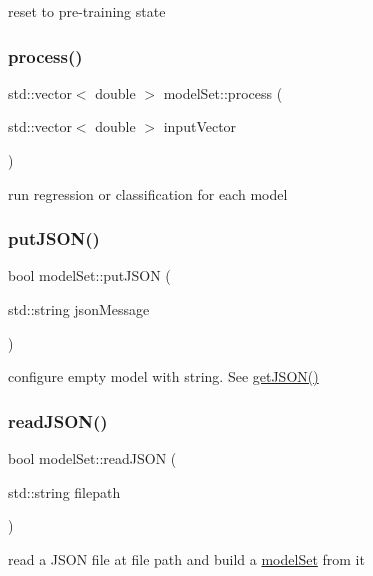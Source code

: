 reset to pre-\/training state \mbox{\label{classmodel_set_a232b11aa2987dd7db56c0f55edf868ea}} 
\subsubsection{\texorpdfstring{process()}{process()}}
{\footnotesize\ttfamily std\+::vector$<$ double $>$ model\+Set\+::process (\begin{DoxyParamCaption}\item[{std\+::vector$<$ double $>$}]{input\+Vector }\end{DoxyParamCaption})}

run regression or classification for each model \mbox{\label{classmodel_set_a09b07168fbe9d9377eb26f30bf16884c}} 
\subsubsection{\texorpdfstring{put\+J\+S\+O\+N()}{putJSON()}}
{\footnotesize\ttfamily bool model\+Set\+::put\+J\+S\+ON (\begin{DoxyParamCaption}\item[{std\+::string}]{json\+Message }\end{DoxyParamCaption})}

configure empty model with string. See \hyperlink{classmodel_set_a031987885b1462ec7d7dbeef0c803d97}{get\+J\+S\+O\+N()} \mbox{\label{classmodel_set_a8f7a837515889c6bddb3184a022b1727}} 
\subsubsection{\texorpdfstring{read\+J\+S\+O\+N()}{readJSON()}}
{\footnotesize\ttfamily bool model\+Set\+::read\+J\+S\+ON (\begin{DoxyParamCaption}\item[{std\+::string}]{filepath }\end{DoxyParamCaption})}

read a J\+S\+ON file at file path and build a \hyperlink{classmodel_set}{model\+Set} from it \mbox{\label{classmodel_set_ab0b16ec988c8077158de1c3d8986df03}} 
